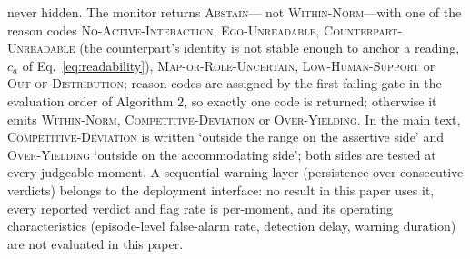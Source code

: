 \documentclass[12pt,a4paper]{article}
\begin{document}
never hidden. The monitor returns \textsc{Abstain}---
not \textsc{Within-Norm}---with one of the reason codes \textsc{No-Active-Interaction},
\textsc{Ego-Unreadable}, \textsc{Counterpart-Unreadable} (the counterpart's identity is not stable
enough to anchor a reading, $c_a$ of Eq.~\ref{eq:readability}), \textsc{Map-or-Role-Uncertain},
\textsc{Low-Human-Support} or \textsc{Out-of-Distribution}; reason codes are assigned by the first failing gate in the evaluation order of Algorithm 2, so exactly one code is returned; otherwise it emits \textsc{Within-Norm},
\textsc{Competitive-Deviation} or \textsc{Over-Yielding}. In the main text,
\textsc{Competitive-Deviation} is written `outside the range on the assertive side' and
\textsc{Over-Yielding} `outside on the accommodating side'; both sides are tested at every
judgeable moment. A sequential warning layer (persistence over consecutive verdicts) belongs to the
deployment interface: no result in this paper uses it, every reported verdict and flag rate is
per-moment, and its operating characteristics (episode-level false-alarm rate, detection delay,
warning duration) are not evaluated in this paper.
\end{document}
